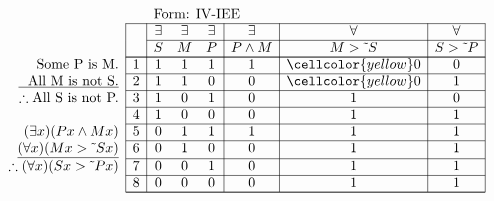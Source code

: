 \documentclass[10pt,legalpaper,landscape,cmtt]{article}
\begin{document}
{\begin{minipage}[t]{3.25in}
	\(
	\begin{array}{r|c|ccc|c|c|c|}
		\multicolumn{2}{c}{}&\multicolumn{6}{l}{\mbox{Form: IV-IEE}} \\ \cline{2-8}
		\hspace{1in}	&	& \exists & \exists & \exists & \exists & \forall & \forall\\ \cline{3-8}
		&	& S & M & P &  P \wedge M  &  M > \tilde~S  &  S > \tilde~P \\ \cline{2-8} \cline{2-8}
		\phantom{\therefore}\mbox{Some P is M.}   & 1 & 1 & 1 & 1 &   1   &   \cellcolor{yellow} 0   &   0  \\ \cline{2-8}
		\underline{\phantom{\therefore}\mbox{All M is not S.}}   & 2 & 1 & 1 & 0 &   0   &   \cellcolor{yellow} 0   &   1  \\ \cline{2-8}
		\therefore \mbox{All S is not P.}   & 3 & 1 & 0 & 1 &   0   &   1   &   0  \\ \cline{2-8}
		& 4 & 1 & 0 & 0 &   0   &   1   &   1  \\ \cline{2-8}
		(\exists x)(Px \wedge Mx)   & 5 & 0 & 1 & 1 &   1   &   1   &   1  \\ \cline{2-8}
		\underline{(\forall x)(Mx > \tilde~Sx)}   & 6 & 0 & 1 & 0 &   0   &   1   &   1  \\ \cline{2-8}
		\therefore(\forall x)(Sx > \tilde~Px)   & 7 & 0 & 0 & 1 &   0   &   1   &   1  \\ \cline{2-8}
		& 8 & 0 & 0 & 0 &   0   &   1   &   1   \\ \cline{2-8}\cline{2-8} 
	\end{array}
	\)
\end{minipage}

}
\end{document}

